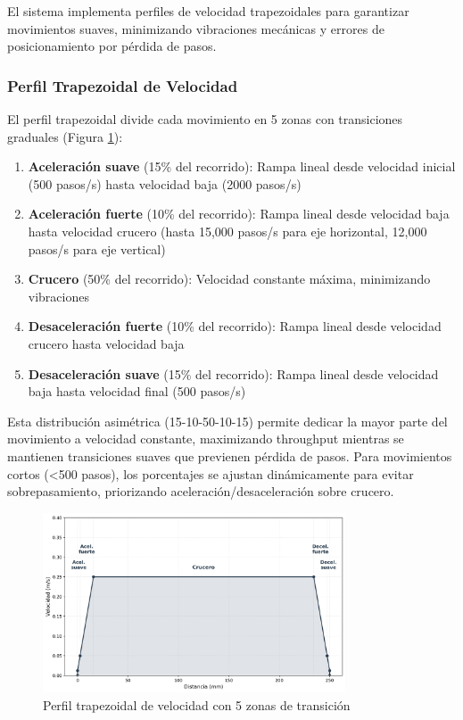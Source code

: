 El sistema implementa perfiles de velocidad trapezoidales para garantizar movimientos suaves, minimizando vibraciones mecánicas y errores de posicionamiento por pérdida de pasos.

\subsubsection{Perfil Trapezoidal de Velocidad}

El perfil trapezoidal divide cada movimiento en 5 zonas con transiciones graduales (Figura \ref{fig:perfil_trapezoidal}):

\begin{enumerate}
    \item \textbf{Aceleración suave} (15\% del recorrido): Rampa lineal desde velocidad inicial (500 pasos/s) hasta velocidad baja (2000 pasos/s)
    \item \textbf{Aceleración fuerte} (10\% del recorrido): Rampa lineal desde velocidad baja hasta velocidad crucero (hasta 15,000 pasos/s para eje horizontal, 12,000 pasos/s para eje vertical)
    \item \textbf{Crucero} (50\% del recorrido): Velocidad constante máxima, minimizando vibraciones
    \item \textbf{Desaceleración fuerte} (10\% del recorrido): Rampa lineal desde velocidad crucero hasta velocidad baja
    \item \textbf{Desaceleración suave} (15\% del recorrido): Rampa lineal desde velocidad baja hasta velocidad final (500 pasos/s)
\end{enumerate}

Esta distribución asimétrica (15-10-50-10-15) permite dedicar la mayor parte del movimiento a velocidad constante, maximizando throughput mientras se mantienen transiciones suaves que previenen pérdida de pasos. Para movimientos cortos (<500 pasos), los porcentajes se ajustan dinámicamente para evitar sobrepasamiento, priorizando aceleración/desaceleración sobre crucero.

\begin{figure}[H]
    \centering
    \includegraphics[width=0.8\textwidth]{imagenes/perfil_trapezoidal_velocidad.png}
    \caption{Perfil trapezoidal de velocidad con 5 zonas de transición}
    \label{fig:perfil_trapezoidal}
\end{figure}

